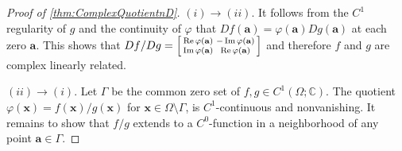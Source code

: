 \documentclass{article}
\newcommand{\COMMENT}[3]{\begingroup\color{#2}\textbf{#1: }#3\endgroup}
\newcommand{\Sadashige}[1]{\COMMENT{Sadashige: }{blue}{#1}}
\newcommand{\Albert}[1]{{\color[rgb]{0.2,0.4,0.8}\textbf{Albert: } #1}}
\newcommand{\suggest}[1]{{\color[rgb]{0.0,0.3,0.8} #1}}
\theoremstyle{theorem}
\theoremstyle{definition}
\def\CC{\mathbb{C}}
\def\RR{\mathbb{R}}
\def\ba{\mathbf{a}}
\def\bx{\mathbf{x}}
\renewcommand{\Im}{\operatorname{Im}}
\renewcommand{\Re}{\operatorname{Re}}
\begin{document}
\begin{proof}[Proof of \autoref{thm:ComplexQuotientnD}]
{$(i)\to (ii)$.} 
It follows from the $C^1$ regularity of $g$ and the continuity of $\varphi$ that $Df(\ba)=\varphi(\ba)Dg(\ba)$ at each zero $\ba$. This shows that \(Df/Dg = \begin{bsmallmatrix}
    \Re\varphi(\ba)&-\Im\varphi(\ba)\\\Im\varphi(\ba)&\Re\varphi(\ba)
\end{bsmallmatrix}\) and therefore \(f\) and \(g\) are complex linearly related.


\vspace{5pt}
\noindent $(ii)\to (i)$.
    Let \(\Gamma\) be the common zero set of \(f,g\in C^1(\Omega;\CC)\).  
    The quotient \(\varphi(\bx) = f(\bx)/g(\bx)\) for \(\bx\in \Omega\setminus\Gamma\), is \(C^1\)-continuous and nonvanishing.
    It remains to show that \(f/g\) extends to a \(C^{0}\)-function in a neighborhood of any point \(\ba\in \Gamma\).  


\end{proof}
\end{document}
